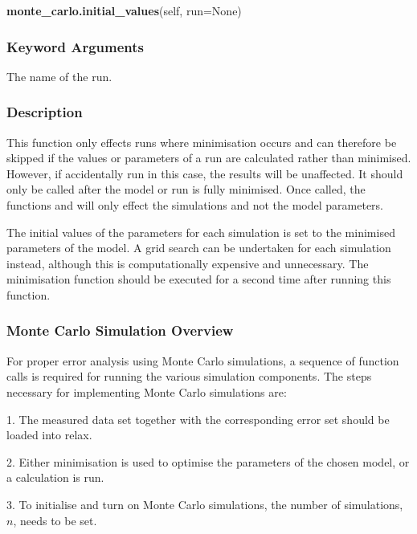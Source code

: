 \textsf{\textbf{monte\_carlo.initial\_values}(self, run=None)}


\subsubsection{Keyword Arguments}


  The name of the run.

\subsubsection{Description}

This function only effects runs where minimisation  occurs and can therefore be skipped if
the values or parameters of a run are calculated rather than minimised.   However, if
accidentally run in this case, the results will be unaffected.  It should only be called
after the model or run is fully minimised.   Once called, the functions 
 and
 will only effect the simulations and not the model parameters.

The initial values of the parameters for each simulation is set to the minimised  parameters
of the model.  A grid search can be undertaken for each simulation instead, although this
is computationally expensive and unnecessary.  The minimisation  function should be executed
for a second time after running this function.



\subsubsection{Monte Carlo Simulation Overview}

For proper error analysis using Monte Carlo simulations, a sequence  of function calls is
required for running the various simulation components.  The steps necessary for
implementing Monte Carlo simulations are:

1.  The measured data set together with the corresponding error set should be loaded into
relax.

2.  Either minimisation  is used to optimise  the parameters of the chosen model, or a
calculation is run.

3.  To initialise and turn on Monte Carlo simulations, the number of simulations, $n$, needs
to be set.

